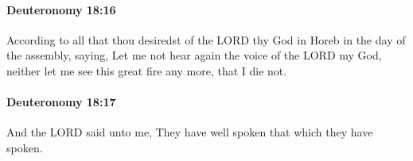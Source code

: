 		\paragraph{Deuteronomy 18:16} %
			\label{DEUTERONOMY-18-16}

			According to all that thou desiredst of the LORD thy God in Horeb in the day of the assembly, saying, Let me not hear again the voice of the LORD my God, neither let me see this great fire any more, that I die not.


		\paragraph{Deuteronomy 18:17} %
			\label{DEUTERONOMY-18-17}

			And the LORD said unto me, They have well spoken that which they have spoken.


